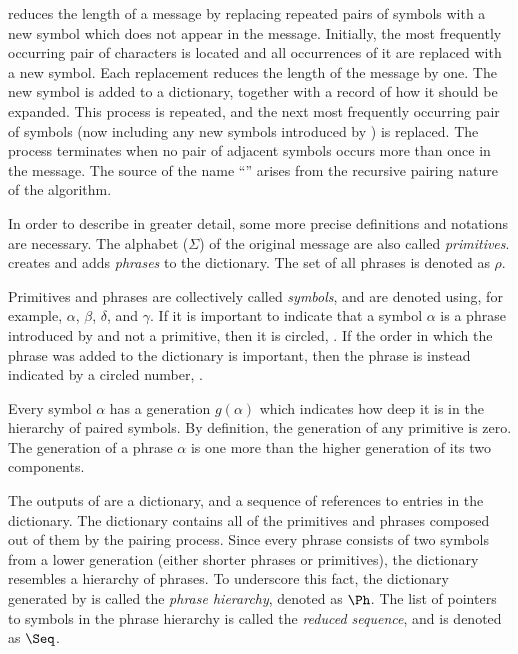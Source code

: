 
\repair reduces the length of a message by replacing repeated
pairs of symbols with a new symbol which does not appear in the
message.  
Initially, the most frequently occurring pair of characters
is located and all occurrences of it are replaced with a new symbol.
Each replacement reduces the length of the message by one.
The new symbol is added to a dictionary, together with a 
record of how it should be expanded.  This process is 
repeated, and the next most frequently occurring pair of symbols 
(now including any new symbols introduced by 
\repair) is replaced.  The process terminates when no 
pair of adjacent symbols occurs more than once in the message.  
The source of the name ``\repair''
arises from the recursive pairing nature of the algorithm.

In order to describe \repair in greater detail, some more precise 
definitions and notations are necessary.  The alphabet ($\Sigma$)
of the original message are also called {\emph {primitives}}.  
\repair
creates and adds {\emph {phrases}} to the dictionary.  The set
of all phrases is denoted as $\rho$.  

Primitives and phrases are collectively called {\emph {symbols}}, 
and are denoted using, for example, $\alpha$, $\beta$, $\delta$, and
$\gamma$.  
If it is important to indicate that a symbol $\alpha$ is a 
phrase introduced by \repair and not a primitive, then it 
is circled, \tc{$\alpha$}.  If the
order in which the phrase was added to the dictionary is important,
then the phrase is instead indicated by a circled number, .

Every symbol $\alpha$ has a generation
$g(\alpha)$ which indicates how deep 
it is in the hierarchy of paired symbols.  By definition, 
the generation of any primitive is zero.  The generation of a 
phrase $\alpha$ is one more than the higher generation of its 
two components.

The outputs of \repair are a dictionary, and a sequence of 
references to entries in the dictionary.  
The dictionary contains all of the primitives and
phrases composed out of them by the pairing process.
Since every phrase consists of two symbols from
a lower generation (either shorter phrases or primitives), the
dictionary resembles a hierarchy of phrases.  To underscore this
fact, the dictionary generated by \repair is called the 
{\emph {phrase hierarchy}}, denoted as $\Ph$.
The list of pointers to symbols in the phrase hierarchy is called the 
{\emph {reduced sequence}}, and is denoted as $\Seq$.



